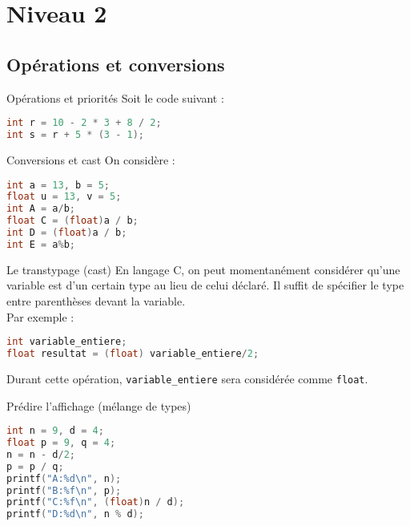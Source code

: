 \section{Niveau 2}

\subsection{Opérations et conversions}

\begin{UPSTIexercice}{Opérations et priorités}
Soit le code suivant : 
\begin{lstlisting}[language=C]
int r = 10 - 2 * 3 + 8 / 2;
int s = r + 5 * (3 - 1);
\end{lstlisting}
\end{UPSTIexercice}

\noindent\begin{minipage}{.49\linewidth}
\begin{UPSTIexercice}{Conversions et cast}
On considère :
\begin{lstlisting}[language=C]
int a = 13, b = 5;
float u = 13, v = 5;
int A = a/b;
float C = (float)a / b;
int D = (float)a / b;
int E = a%b;
\end{lstlisting}
\end{UPSTIexercice}
\end{minipage}\hfill
\begin{minipage}{.49\linewidth}
    \begin{UPSTIinfor}{Le transtypage (cast)}
        En langage C, on peut momentanément considérer qu'une variable est d'un certain type au lieu de celui déclaré. Il suffit de spécifier le type entre parenthèses devant la variable. \\
        Par exemple : 
        \begin{lstlisting}[language=c]
int variable_entiere;
float resultat = (float) variable_entiere/2;\end{lstlisting}
        Durant cette opération, \verb|variable_entiere| sera considérée comme \verb|float|.
    \end{UPSTIinfor}
\end{minipage}


\begin{UPSTIexercice}{Prédire l'affichage (mélange de types)}
\begin{lstlisting}[language=C]
int n = 9, d = 4;
float p = 9, q = 4;
n = n - d/2;
p = p / q;
printf("A:%d\n", n);
printf("B:%f\n", p);
printf("C:%f\n", (float)n / d);
printf("D:%d\n", n % d);
\end{lstlisting}
\end{UPSTIexercice}

